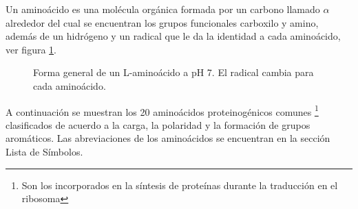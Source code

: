 Un amino\'{a}cido es una mol\'{e}cula org\'{a}nica formada por un carbono llamado $\alpha$ alrededor del cual se encuentran los grupos funcionales carboxilo y amino, adem\'{a}s de un hidr\'{o}geno y un radical que le da la identidad a cada amino\'{a}cido, ver figura \ref{fig:amino}.\\
\begin{figure}[H]
\centering
{}
\caption{Forma general de un L-amino\'{a}cido a pH 7. El radical  cambia para cada amino\'{a}cido.}\label{fig:amino}
\end{figure}
A continuaci\'{o}n se muestran los 20 amino\'{a}cidos proteinog\'{e}nicos  comunes \footnote{Son los incorporados en la s\'{i}ntesis de prote\'{i}nas durante la traducci\'{o}n en el ribosoma}  clasificados de acuerdo a la carga, la polaridad y la formaci\'{o}n de grupos arom\'{a}ticos. Las abreviaciones de los amino\'{a}cidos se encuentran en la secci\'{o}n Lista de S\'{i}mbolos.\\
